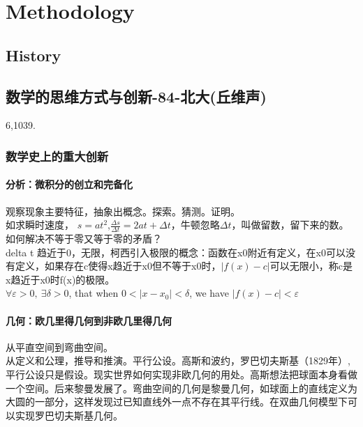 


\chapter{Methodology}


\section{History}


\section{数学的思维方式与创新-84-北大(丘维声)}
6,1039. 

\subsection{数学史上的重大创新}


\subsubsection{分析：微积分的创立和完备化}
观察现象主要特征，抽象出概念。探索。猜测。证明。\\
如求瞬时速度， $s=at^2$,$\frac{\Delta s}{\Delta t}=2at+\Delta t$，牛顿忽略$\Delta t$，叫做留数，留下来的数。\\
如何解决不等于零又等于零的矛盾？\\
delta t 趋近于0，无限，柯西引入极限的概念：函数在x0附近有定义，在x0可以没有定义，如果存在c使得x趋近于x0但不等于x0时，$|f(x)-c|$可以无限小，称c是x趋近于x0时f(x)的极限。\\
$\forall \varepsilon >0,\ \exists \delta >0$, that when $0<|x-x_0|<\delta$, we have $|f(x)-c|<\varepsilon$
\subsubsection{几何：欧几里得几何到非欧几里得几何}
从平直空间到弯曲空间。\\
从定义和公理，推导和推演。平行公设。高斯和波约，罗巴切夫斯基（1829年）,平行公设只是假设。现实世界如何实现非欧几何的用处。高斯想法把球面本身看做一个空间。后来黎曼发展了。弯曲空间的几何是黎曼几何，如球面上的直线定义为大圆的一部分，这样发现过已知直线外一点不存在其平行线。在双曲几何模型下可以实现罗巴切夫斯基几何。\\
